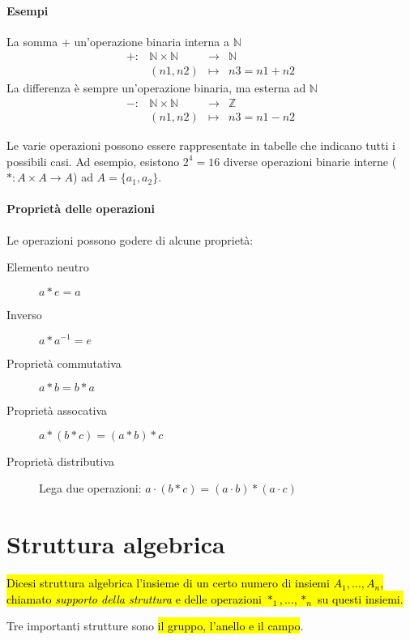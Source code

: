 \documentclass[a4paper,12pt,oneside]{article}
\begin{document}
\paragraph{Esempi}La somma + un'operazione binaria interna a $\mathbb{N}$
\[
    \begin{array}{cccc}
       +: &\mathbb{N} \times \mathbb{N} &\to &\mathbb{N} \\
        &(n1, n2) &\mapsto &n3 = n1 + n2
    \end{array}
\]
La differenza è sempre un'operazione binaria, ma esterna ad $\mathbb{N}$
\[
    \begin{array}{cccc}
        -: &\mathbb{N} \times \mathbb{N} &\to &\mathbb{Z} \\
        &(n1, n2) &\mapsto &n3 = n1 - n2
    \end{array}
\]

Le varie operazioni possono essere rappresentate in tabelle che indicano tutti i
possibili casi. Ad esempio, esistono $2^4 = 16$ diverse operazioni binarie
interne ($\ast: A \times A \to A$) ad $A = \{a_1, a_2\}$.

\paragraph{Proprietà delle operazioni} Le operazioni possono godere di alcune
proprietà:
\begin{description}
    \item[Elemento neutro] $a \ast e = a$
    \item[Inverso] $a \ast a^{-1} = e$
    \item[Proprietà commutativa] $a \ast b = b \ast a$
    \item[Proprietà assocativa] $a \ast (b \ast c) = (a \ast b) \ast c$
    \item[Proprietà distributiva] Lega due operazioni:
        $a \cdot (b \ast c) = (a \cdot b) \ast (a \cdot c)$
\end{description}

\section{Struttura algebrica}
\hl{Dicesi struttura algebrica l'insieme di un certo numero di insiemi
$A_1, \ldots, A_n$, chiamato \textit{supporto della struttura} e delle
operazioni $\ast_1, \ldots, \ast_n$ su questi insiemi.}

Tre importanti strutture sono \hl{il gruppo, l'anello e il campo}.
\end{document}
